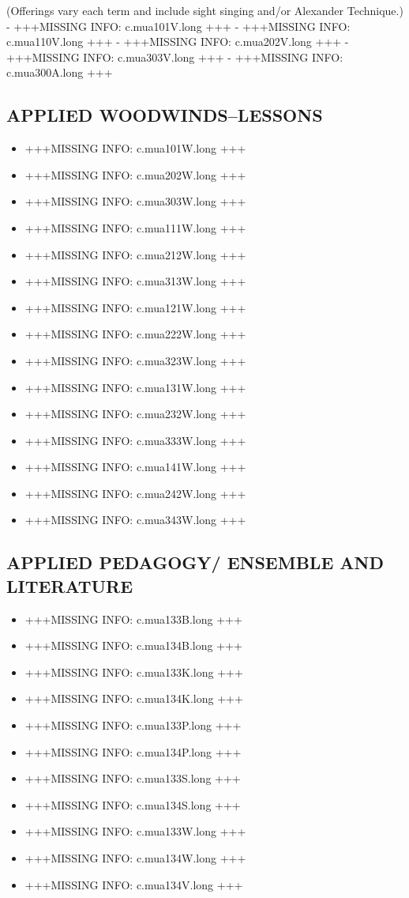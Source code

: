 \documentclass[
  letterpaper,
]{scrbook}
\providecommand{\tightlist}{%
  \setlength{\itemsep}{0pt}\setlength{\parskip}{0pt}}
\begin{document}
(Offerings vary each term and include sight singing and/or Alexander
Technique.) - +++MISSING INFO: c.mua101V.long +++ - +++MISSING INFO:
c.mua110V.long +++ - +++MISSING INFO: c.mua202V.long +++ - +++MISSING
INFO: c.mua303V.long +++ - +++MISSING INFO: c.mua300A.long +++

\subsection{APPLIED WOODWINDS--LESSONS}\label{applied-woodwindslessons}

\begin{itemize}
\tightlist
\item
  +++MISSING INFO: c.mua101W.long +++
\item
  +++MISSING INFO: c.mua202W.long +++
\item
  +++MISSING INFO: c.mua303W.long +++
\item
  +++MISSING INFO: c.mua111W.long +++
\item
  +++MISSING INFO: c.mua212W.long +++
\item
  +++MISSING INFO: c.mua313W.long +++
\item
  +++MISSING INFO: c.mua121W.long +++
\item
  +++MISSING INFO: c.mua222W.long +++
\item
  +++MISSING INFO: c.mua323W.long +++
\item
  +++MISSING INFO: c.mua131W.long +++
\item
  +++MISSING INFO: c.mua232W.long +++
\item
  +++MISSING INFO: c.mua333W.long +++
\item
  +++MISSING INFO: c.mua141W.long +++
\item
  +++MISSING INFO: c.mua242W.long +++
\item
  +++MISSING INFO: c.mua343W.long +++
\end{itemize}

\subsection{APPLIED PEDAGOGY/ ENSEMBLE AND
LITERATURE}\label{applied-pedagogy-ensemble-and-literature}

\begin{itemize}
\tightlist
\item
  +++MISSING INFO: c.mua133B.long +++
\item
  +++MISSING INFO: c.mua134B.long +++
\item
  +++MISSING INFO: c.mua133K.long +++
\item
  +++MISSING INFO: c.mua134K.long +++
\item
  +++MISSING INFO: c.mua133P.long +++
\item
  +++MISSING INFO: c.mua134P.long +++
\item
  +++MISSING INFO: c.mua133S.long +++
\item
  +++MISSING INFO: c.mua134S.long +++
\item
  +++MISSING INFO: c.mua133W.long +++
\item
  +++MISSING INFO: c.mua134W.long +++
\item
  +++MISSING INFO: c.mua134V.long +++
\end{itemize}
\end{document}
